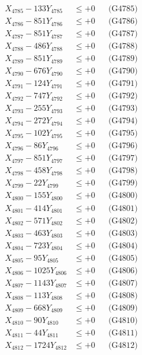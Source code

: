 \documentclass[a4paper,10pt]{article}
\begin{document}
{\begin{align}
X_{4785} - 133Y_{4785} &\leq +0 && \text{(G4785)} \\
X_{4786} - 851Y_{4786} &\leq +0 && \text{(G4786)} \\
X_{4787} - 851Y_{4787} &\leq +0 && \text{(G4787)} \\
X_{4788} - 486Y_{4788} &\leq +0 && \text{(G4788)} \\
X_{4789} - 851Y_{4789} &\leq +0 && \text{(G4789)} \\
X_{4790} - 676Y_{4790} &\leq +0 && \text{(G4790)} \\
\allowbreak
X_{4791} - 124Y_{4791} &\leq +0 && \text{(G4791)} \\
X_{4792} - 747Y_{4792} &\leq +0 && \text{(G4792)} \\
X_{4793} - 255Y_{4793} &\leq +0 && \text{(G4793)} \\
X_{4794} - 272Y_{4794} &\leq +0 && \text{(G4794)} \\
X_{4795} - 102Y_{4795} &\leq +0 && \text{(G4795)} \\
X_{4796} - 86Y_{4796} &\leq +0 && \text{(G4796)} \\
X_{4797} - 851Y_{4797} &\leq +0 && \text{(G4797)} \\
X_{4798} - 458Y_{4798} &\leq +0 && \text{(G4798)} \\
X_{4799} - 22Y_{4799} &\leq +0 && \text{(G4799)} \\
X_{4800} - 155Y_{4800} &\leq +0 && \text{(G4800)} \\
\allowbreak
X_{4801} - 414Y_{4801} &\leq +0 && \text{(G4801)} \\
X_{4802} - 571Y_{4802} &\leq +0 && \text{(G4802)} \\
X_{4803} - 463Y_{4803} &\leq +0 && \text{(G4803)} \\
X_{4804} - 723Y_{4804} &\leq +0 && \text{(G4804)} \\
X_{4805} - 95Y_{4805} &\leq +0 && \text{(G4805)} \\
X_{4806} - 1025Y_{4806} &\leq +0 && \text{(G4806)} \\
X_{4807} - 1143Y_{4807} &\leq +0 && \text{(G4807)} \\
X_{4808} - 113Y_{4808} &\leq +0 && \text{(G4808)} \\
X_{4809} - 668Y_{4809} &\leq +0 && \text{(G4809)} \\
X_{4810} - 90Y_{4810} &\leq +0 && \text{(G4810)} \\
\allowbreak
X_{4811} - 44Y_{4811} &\leq +0 && \text{(G4811)} \\
X_{4812} - 1724Y_{4812} &\leq +0 && \text{(G4812)} \\

\end{align}}
\end{document}
